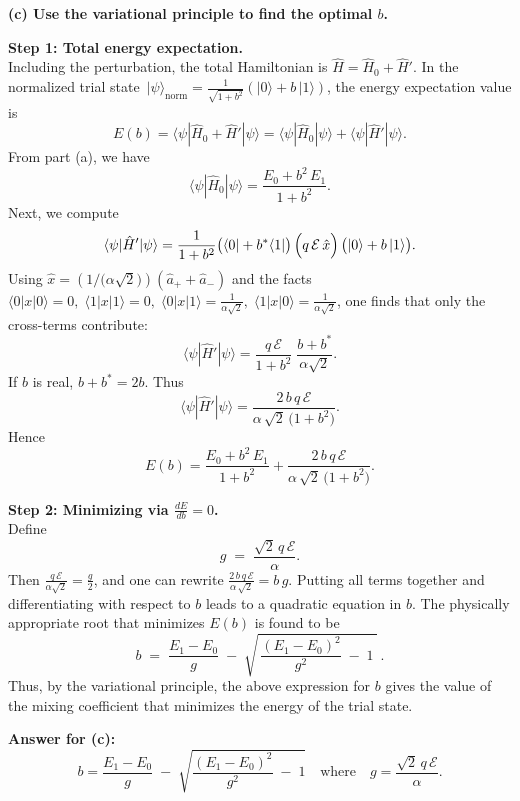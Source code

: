 \documentclass{article}
\begin{document}
\textbf{(c) Use the variational principle to find the optimal \(b\). \quad [9 marks]}

\textbf{Step 1: Total energy expectation.}\\
Including the perturbation, the total Hamiltonian is 
\(\hat{H} = \hat{H}_0 + \hat{H}'\). 
In the normalized trial state 
\(\,|\psi\rangle_{\text{norm}} = \tfrac{1}{\sqrt{1+b^2}} (|0\rangle + b\,|1\rangle)\),
the energy expectation value is
\[
E(b) 
= \langle \psi|\hat{H}_0 + \hat{H}'|\psi\rangle 
= \langle \psi|\hat{H}_0|\psi\rangle + \langle \psi|\hat{H}'|\psi\rangle.
\]
From part (a), we have
\[
\langle \psi|\hat{H}_0|\psi\rangle = \frac{E_0 + b^2\,E_1}{1 + b^2}.
\]
Next, we compute
\[
\langle \psi|\hat{H}'|\psi\rangle 
= \frac{1}{1 + b^2}
\bigl(\langle 0| + b^*\langle 1|\bigr)\,
\Bigl(q\,\mathcal{E}\,\hat{x}\Bigr)\,
\bigl(|0\rangle + b\,|1\rangle\bigr).
\]
Using \(\hat{x} = (1/\bigl(\alpha\sqrt{2}\bigr))(\hat{a}_+ + \hat{a}_-)\) and the facts 
\(\langle 0|x|0\rangle=0,\;\langle 1|x|1\rangle=0,\;
\langle 0|x|1\rangle = \tfrac{1}{\alpha\sqrt{2}},\;
\langle 1|x|0\rangle = \tfrac{1}{\alpha\sqrt{2}}\), 
one finds that only the cross-terms contribute:
\[
\langle \psi|\hat{H}'|\psi\rangle 
= \frac{q\,\mathcal{E}}{1 + b^2}\;\frac{b + b^*}{\alpha\sqrt{2}}.
\]
If \(b\) is real, \(b + b^* = 2b\). Thus
\[
\langle \psi|\hat{H}'|\psi\rangle 
= \frac{2\,b\,q\,\mathcal{E}}{\alpha\,\sqrt{2}\,\bigl(1 + b^2\bigr)}.
\]
Hence
\[
E(b) 
= \frac{E_0 + b^2\,E_1}{1 + b^2} 
+ \frac{2\,b\,q\,\mathcal{E}}{\alpha\,\sqrt{2}\,\bigl(1 + b^2\bigr)}.
\]

\textbf{Step 2: Minimizing via \(\tfrac{dE}{db}=0\).}\\
Define 
\[
g \;=\; \frac{\sqrt{2}\,q\,\mathcal{E}}{\alpha}.
\]
Then 
\(\tfrac{q\,\mathcal{E}}{\alpha\sqrt{2}} = \tfrac{g}{2}\), 
and one can rewrite 
\(\tfrac{2\,b\,q\,\mathcal{E}}{\alpha\,\sqrt{2}} = b\,g.\)
Putting all terms together and differentiating with respect to \(b\) leads to a quadratic equation in \(b\). The physically appropriate root that minimizes \(E(b)\) is found to be
\[
b \;=\; \frac{E_1 - E_0}{g}
\;-\;
\sqrt{\,
\frac{(E_1 - E_0)^2}{g^2}
\;-\; 
1\;}
\,.
\]
Thus, by the variational principle, the above expression for \(b\) gives the value of the mixing coefficient that minimizes the energy of the trial state.

\bigskip

\noindent
\textbf{Answer for (c):}\quad
\[
b 
= 
\frac{E_1 - E_0}{g}
\;-\;
\sqrt{
\frac{(E_1 - E_0)^2}{g^2}
\;-\;
1
}
\quad
\text{where}
\quad
g = \frac{\sqrt{2}\,q\,\mathcal{E}}{\alpha}.
\]
\end{document}

